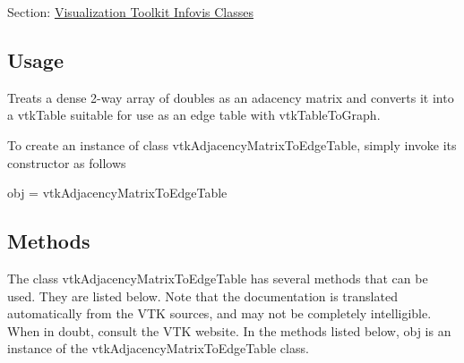 Section\-: \hyperlink{sec_vtkinfovis}{Visualization Toolkit Infovis Classes} \hypertarget{vtkwidgets_vtkxyplotwidget_Usage}{}\subsection{Usage}\label{vtkwidgets_vtkxyplotwidget_Usage}
Treats a dense 2-\/way array of doubles as an adacency matrix and converts it into a vtk\-Table suitable for use as an edge table with vtk\-Table\-To\-Graph.

To create an instance of class vtk\-Adjacency\-Matrix\-To\-Edge\-Table, simply invoke its constructor as follows \begin{DoxyVerb}  obj = vtkAdjacencyMatrixToEdgeTable
\end{DoxyVerb}
 \hypertarget{vtkwidgets_vtkxyplotwidget_Methods}{}\subsection{Methods}\label{vtkwidgets_vtkxyplotwidget_Methods}
The class vtk\-Adjacency\-Matrix\-To\-Edge\-Table has several methods that can be used. They are listed below. Note that the documentation is translated automatically from the V\-T\-K sources, and may not be completely intelligible. When in doubt, consult the V\-T\-K website. In the methods listed below, {\ttfamily obj} is an instance of the vtk\-Adjacency\-Matrix\-To\-Edge\-Table class. 
